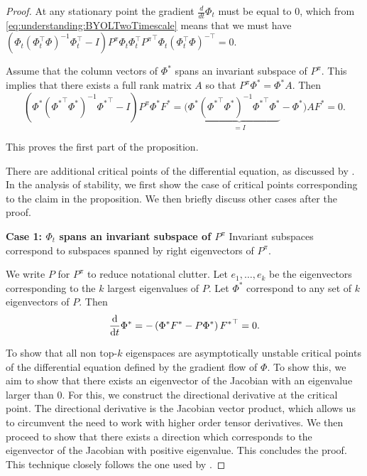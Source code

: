\begin{proof}
    At any stationary point the gradient $\frac{d}{dt}\Phi_t$ must be equal to $0$, which from \cref{eq:understanding:BYOLTwoTimescale} means that we must have $\left(\Phi_t\left(\Phi^\top_t \Phi\right)^{-1}\Phi_t^\top - I\right)P^\pi\Phi_t \Phi_t^\top {P^\pi}^\top \Phi_t\left(\Phi^\top_t \Phi\right)^{-\top}=0$.

    Assume that the column vectors of $\Phi^*$ spans an invariant subspace of $P^\pi$. This implies that there exists a full rank matrix $A$ so that $P^\pi \Phi^* = \Phi^*A$.
    Then 
    $$\left(\Phi^*\left({\Phi^*}^\top \Phi^*\right)^{-1}{\Phi^*}^\top - I\right)P^\pi\Phi^* F^*=\Big(\Phi^*\underbrace{\left({\Phi^*}^\top \Phi^*\right)^{-1}{\Phi^*}^\top\Phi^*}_{=I} - \Phi^*\Big)A F^*=0.$$

This proves the first part of the proposition.

There are additional critical points of the differential equation, as discussed by \textcite{tang2022understanding}.
In the analysis of stability, we first show the case of critical points corresponding to the claim in the proposition.
We then briefly discuss other cases after the proof.

\textbf{Case 1: $\Phi_t$ spans an invariant subspace of $P^\pi$}
Invariant subspaces correspond to subspaces spanned by right eigenvectors of $P^\pi$.

We write $P$ for $P^\pi$ to reduce notational clutter.
Let $e_1,\dots,e_k$ be the eigenvectors corresponding to the $k$ largest eigenvalues of $P$.
Let $\Phi^*$ correspond to any set of $k$ eigenvectors of $P$. Then
\begin{align}
    \frac{\mathrm{d}}{\mathrm{d} t}\Phi^* = -\left(\Phi^* F^* - P \Phi^*\right) {F^*}^\top = 0.
\end{align}

To show that all non top-$k$ eigenspaces are asymptotically unstable critical points of the differential equation defined by the gradient flow of $\Phi$.
To show this, we aim to show that there exists an eigenvector of the Jacobian with an eigenvalue larger than $0$.
For this, we construct the directional derivative at the critical point.
The directional derivative is the Jacobian vector product, which allows us to circumvent the need to work with higher order tensor derivatives.
We then proceed to show that there exists a direction which corresponds to the eigenvector of the Jacobian with positive eigenvalue.
This concludes the proof.
This technique closely follows the one used by \textcite{lelan2023bootstrapped}.


\end{proof}
